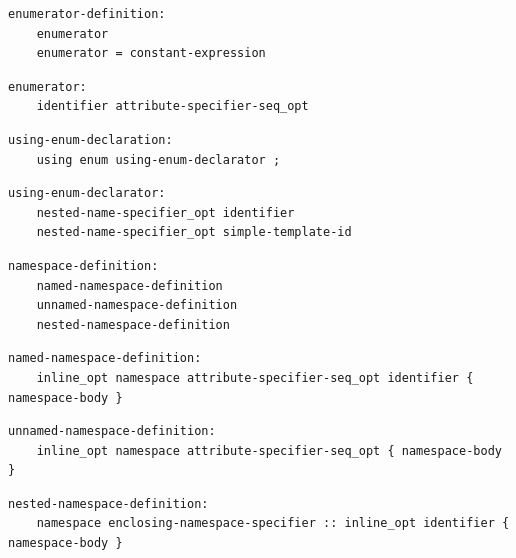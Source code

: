 \noindent\textbf{\texttt{}}\par
\begin{lstlisting}
enumerator-definition:
    enumerator
    enumerator = constant-expression
\end{lstlisting}

\noindent\textbf{\texttt{}}\par
\begin{lstlisting}
enumerator:
    identifier attribute-specifier-seq_opt
\end{lstlisting}

\noindent\textbf{\texttt{}}\par
\begin{lstlisting}
using-enum-declaration:
    using enum using-enum-declarator ;
\end{lstlisting}

\noindent\textbf{\texttt{}}\par
\begin{lstlisting}
using-enum-declarator:
    nested-name-specifier_opt identifier
    nested-name-specifier_opt simple-template-id
\end{lstlisting}

\noindent\textbf{\texttt{}}\par
\begin{lstlisting}
namespace-definition:
    named-namespace-definition
    unnamed-namespace-definition
    nested-namespace-definition
\end{lstlisting}

\noindent\textbf{\texttt{}}\par
\begin{lstlisting}
named-namespace-definition:
    inline_opt namespace attribute-specifier-seq_opt identifier { namespace-body }
\end{lstlisting}

\noindent\textbf{\texttt{}}\par
\begin{lstlisting}
unnamed-namespace-definition:
    inline_opt namespace attribute-specifier-seq_opt { namespace-body }
\end{lstlisting}

\noindent\textbf{\texttt{}}\par
\begin{lstlisting}
nested-namespace-definition:
    namespace enclosing-namespace-specifier :: inline_opt identifier { namespace-body }
\end{lstlisting}

